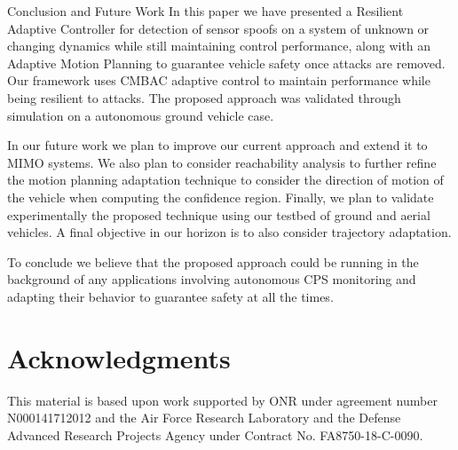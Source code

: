 
\begin{section}{Conclusion and Future Work} \label{sec:conclusion}
In this paper we have presented a Resilient Adaptive Controller for detection of sensor spoofs on a system of unknown or changing dynamics while still maintaining control performance, along with an Adaptive Motion Planning to guarantee vehicle safety once attacks are removed. Our framework uses CMBAC adaptive control to maintain performance while being resilient to attacks. The proposed approach was validated through simulation on a autonomous ground vehicle case. 

In our future work we plan to improve our current approach and extend it to MIMO systems. We also plan to consider reachability analysis to further refine the motion planning adaptation technique to consider the direction of motion of the vehicle when computing the confidence region. Finally, we plan to validate experimentally the proposed technique using our testbed of ground and aerial vehicles. A final objective in our horizon is to also consider trajectory adaptation.

To conclude we believe that the proposed approach could be running in the background of any applications involving autonomous CPS monitoring and adapting their behavior to guarantee safety at all the times.


\end{section}
 \vspace{-5pt}
\section*{Acknowledgments} 
 \vspace{-5pt}
This material is based upon work supported by ONR under agreement number N000141712012 and 
the Air Force Research Laboratory and the Defense Advanced Research Projects Agency under Contract No. FA8750-18-C-0090. 
 \vspace{-5pt}


